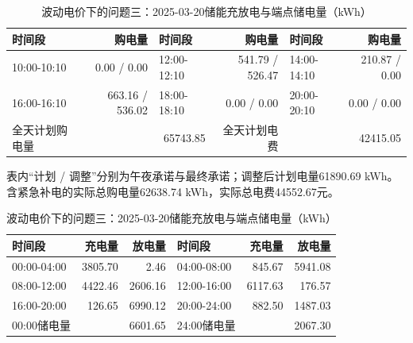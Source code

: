 \begin{table}[H]\centering\small\setlength{\tabcolsep}{5pt}
\caption{波动电价下的问题三：2025-03-20购电结果（电量：kWh；费用：元）}
\begin{tabular}{lrlrlr}\toprule
时间段 & 购电量 & 时间段 & 购电量 & 时间段 & 购电量 \\\midrule
10:00-10:10 & 0.00 / 0.00 & 12:00-12:10 & 541.79 / 526.47 & 14:00-14:10 & 210.87 / 0.00\\
16:00-16:10 & 663.16 / 536.02 & 18:00-18:10 & 0.00 / 0.00 & 20:00-20:10 & 0.00 / 0.00\\
\midrule 全天计划购电量 & \multicolumn{2}{r}{65743.85} & 全天计划电费 & \multicolumn{2}{r}{42415.05}\\\bottomrule
\end{tabular}
\par\vspace{2pt}\footnotesize
表内“计划 / 调整”分别为午夜承诺与最终承诺；调整后计划电量61890.69 kWh。
含紧急补电的实际总购电量62638.74 kWh，实际总电费44552.67元。
\vspace{3pt}\small
\caption{波动电价下的问题三：2025-03-20储能充放电与端点储电量（kWh）}
\begin{tabular}{lrrlrr}\toprule
时间段 & 充电量 & 放电量 & 时间段 & 充电量 & 放电量 \\\midrule
00:00-04:00 & 3805.70 & 2.46 & 04:00-08:00 & 845.67 & 5941.08\\
08:00-12:00 & 4422.46 & 2606.16 & 12:00-16:00 & 6117.63 & 176.57\\
16:00-20:00 & 126.65 & 6990.12 & 20:00-24:00 & 882.50 & 1487.03\\
\midrule 00:00储电量 & \multicolumn{2}{r}{6601.65} & 24:00储电量 & \multicolumn{2}{r}{2067.30}\\\bottomrule
\end{tabular}\end{table}
